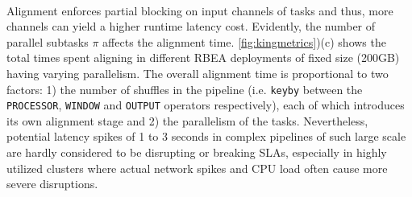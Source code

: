  \\
Alignment enforces partial blocking  on input channels of tasks and thus, more channels can yield a higher runtime latency cost. Evidently, the number of parallel subtasks $\pi$ affects the alignment time. \autoref{fig:kingmetrics})(c) shows the total times spent aligning in different RBEA deployments of fixed size (200GB) having varying parallelism. The overall alignment time is proportional to two factors: 1) the number of shuffles in the pipeline (i.e. \texttt{keyby} between the \texttt{PROCESSOR}, \texttt{WINDOW} and \texttt{OUTPUT} operators respectively), each of which introduces its own alignment stage and 2) the parallelism of the tasks. Nevertheless, potential latency spikes of 1 to 3 seconds in complex pipelines of such large scale are hardly considered to be disrupting or breaking SLAs, especially in highly utilized clusters where actual network spikes and CPU load often cause more severe disruptions.



